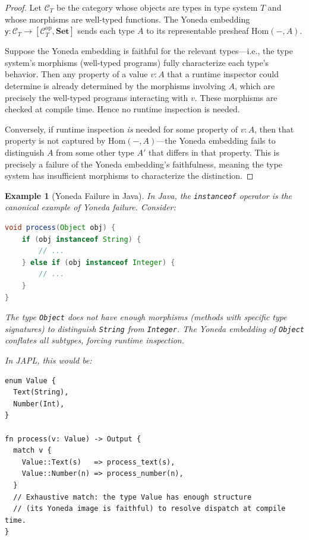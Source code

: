\documentclass[11pt]{article}
\newtheorem{example}[theorem]{Example}
\newcommand{\Set}{\mathbf{Set}}
\begin{document}
\begin{proof}
Let $\mathcal{C}_T$ be the category whose objects are types in type system $T$ and
whose morphisms are well-typed functions. The Yoneda embedding
$\mathsf{y} : \mathcal{C}_T \to [\mathcal{C}_T^{\mathrm{op}}, \Set]$ sends each
type $A$ to its representable presheaf $\mathrm{Hom}(-, A)$.

Suppose the Yoneda embedding is faithful for the relevant types---i.e., the type
system's morphisms (well-typed programs) fully characterize each type's behavior. Then
any property of a value $v : A$ that a runtime inspector could determine is already
determined by the morphisms involving $A$, which are precisely the well-typed programs
interacting with $v$. These morphisms are checked at compile time. Hence no runtime
inspection is needed.

Conversely, if runtime inspection \emph{is} needed for some property of $v : A$, then
that property is not captured by $\mathrm{Hom}(-, A)$---the Yoneda embedding fails to
distinguish $A$ from some other type $A'$ that differs in that property. This is
precisely a failure of the Yoneda embedding's faithfulness, meaning the type system has
insufficient morphisms to characterize the distinction.
\end{proof}

\begin{example}[Yoneda Failure in Java]
\label{ex:java-yoneda}
In Java, the \texttt{instanceof} operator is the canonical example of Yoneda failure.
Consider:
\begin{lstlisting}[language=Java, caption={Yoneda failure: runtime type inspection}]
void process(Object obj) {
    if (obj instanceof String) {
        // ...
    } else if (obj instanceof Integer) {
        // ...
    }
}
\end{lstlisting}
The type \texttt{Object} does not have enough morphisms (methods with specific type
signatures) to distinguish \texttt{String} from \texttt{Integer}. The Yoneda embedding
of \texttt{Object} conflates all subtypes, forcing runtime inspection.

In JAPL, this would be:
\begin{lstlisting}[caption={Yoneda success: compile-time type dispatch in JAPL}]
enum Value {
  Text(String),
  Number(Int),
}

fn process(v: Value) -> Output {
  match v {
    Value::Text(s)   => process_text(s),
    Value::Number(n) => process_number(n),
  }
  // Exhaustive match: the type Value has enough structure
  // (its Yoneda image is faithful) to resolve dispatch at compile time.
}
\end{lstlisting}
\end{example}
\end{document}
